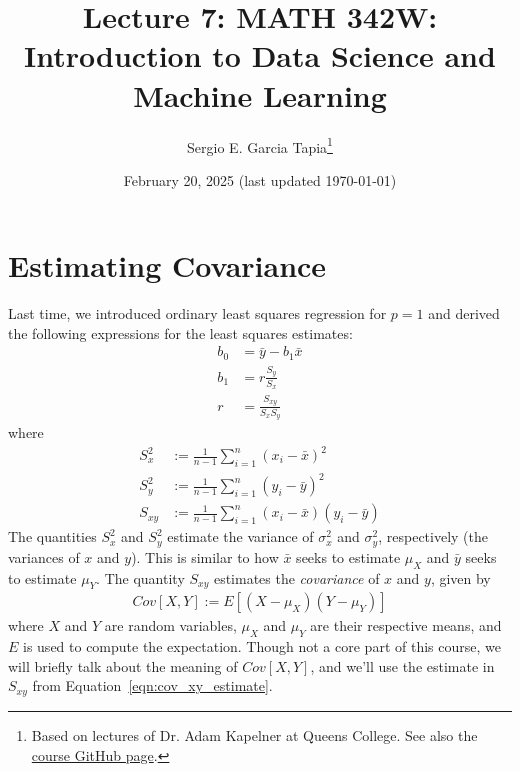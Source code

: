 \documentclass[12pt, a4paper]{article}
\title{Lecture 7: MATH 342W: Introduction to Data Science and Machine Learning}
\author{Sergio E. Garcia Tapia\thanks{Based on lectures of Dr. Adam Kapelner at Queens College.
See also the \href{https://github.com/kapelner/QC_MATH_342W_Spring_2025}{course GitHub page}.}}
\date{February 20, 2025 (last updated \today)}
\theoremstyle{definition}
\begin{document}
	\maketitle
	\section*{Estimating Covariance}
	Last time, we introduced ordinary least squares regression for $p=1$ and derived the following
	expressions for the least squares estimates:
	\begin{align}
		b_0 &= \bar{y} - b_1 \bar{x}\label{eqn:ols_b0}\\
		b_1 &= r\frac{S_y}{S_x}\label{eqn:ols_b1_r}\\
		r &= \frac{S_{xy}}{S_xS_y}\nonumber
	\end{align}
	where
	\begin{align}
		S_x^2  &:= \frac{1}{n-1}\sum_{i=1}^{n}(x_i-\bar{x})^2\nonumber\\
		S_y^2  &:= \frac{1}{n-1}\sum_{i=1}^{n}(y_i-\bar{y})^2\nonumber\\
		S_{xy} &:= \frac{1}{n-1}\sum_{i=1}^{n}(x_i-\bar{x})(y_i-\bar{y})\label{eqn:cov_xy_estimate}
	\end{align}
	The quantities $S_x^2$ and $S_y^2$ estimate the variance of $\sigma_x^2$ and $\sigma_y^2$,
	respectively (the variances of $x$ and $y$). This is similar to how $\bar{x}$ seeks
	to estimate $\mu_X$ and $\bar{y}$ seeks to estimate $\mu_Y$. The quantity $S_{xy}$
	estimates the \emph{covariance} of $x$ and $y$, given by
	\begin{align*}
		Cov[X, Y] := E[(X-\mu_X)(Y-\mu_Y)]
	\end{align*}
	where $X$ and $Y$ are random variables, $\mu_X$ and $\mu_Y$ are their respective means,
	and $E$ is used to compute the expectation. Though not a core part of this course, we
	will briefly talk about the meaning of $Cov[X, Y]$, and we'll use the estimate
	in $S_{xy}$ from Equation~\ref{eqn:cov_xy_estimate}.
\end{document}
